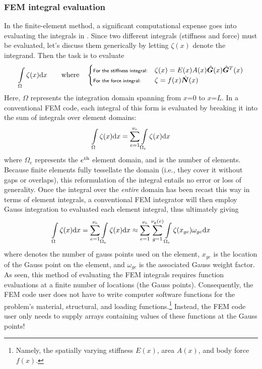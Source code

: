 \subsubsection{FEM integral evaluation}
In the finite-element method, a significant computational expense goes into evaluating the integrals in .  Since two different integrals (stiffness and force) must be evaluated, let's discuss them generically by letting $\zeta(x)$ denote the integrand. Then the task is to evaluate 
\begin{equation}
  \int\limits_\Omega \zeta(x) \mathrm{d} x
\qquad\text{where}\quad
\begin{cases}
\text{\scriptsize{\textsf{For the stiffness integral:}}}& \zeta(x)=E(x)A(x)\hat{\bm{G}}(x)\hat{\bm{G}}^T(x)\\
\text{\scriptsize{\textsf{For the force integral:}}}& \zeta=f(x)\hat{\bm{N}}(x)\\
\end{cases}
\label{eq:LinearBarGenericIntegral}
\end{equation}
Here, $\Omega$ represents the integration domain spanning from $x$=$0$ to $x$=$L$. In a conventional FEM code, each integral of this form is evaluated by breaking it into the sum of integrals over element domains:
\begin{equation}
  \int\limits_\Omega \zeta(x) \mathrm{d} x = \sum\limits_{e=1}^{{\nu_\text{e}}}\int\limits_{\Omega_e} \zeta(x) \mathrm{d} x
\label{eq:LinearBarGenericIntegralBrokenIntoElements}
\end{equation}
where $\Omega_e$ represents the $e^\text{th}$ element domain, and \numelements is the number of elements. Because finite elements fully tessellate the domain (i.e., they cover it without gaps or overlaps), this reformulation of the integral entails no error or loss of generality.  Once the integral over the \emph{entire} domain has been recast this way in terms of element integrals, a conventional FEM integrator will then employ Gauss integration to evaluated each element integral, thus ultimately giving
\begin{equation}
  \int\limits_\Omega \zeta(x) \mathrm{d} x = \sum\limits_{e=1}^{{\nu_\text{e}}}\int\limits_{\Omega_e} \zeta(x) \mathrm{d} x \approx \sum\limits_{e=1}^{{\nu_\text{e}}}\sum\limits_{g=1}^{{\nu_\text{g}(e)}}\int\limits_{\Omega_e} \zeta(x_{ge}) \omega_{ge} \mathrm{d} x
\label{eq:oneDFEMstyleIntegration}
\end{equation}
where \numgaussOnElemente denotes the number of gauss points used on the \eeth element, $x_{ge}$ is the location of the \gth Gauss point on the \eeth element, and $\omega_{ge}$ is the associated Gauss weight factor.  As seen, this method of evaluating the FEM integrals requires function evaluations at a finite number of locations (the Gauss points). Consequently, the FEM code user does not have to write computer software functions for the problem's material, structural, and loading functions.\footnote{Namely, the spatially varying stiffness $E(x)$, area $A(x)$, and body force $f(x)$.} Instead, the FEM code user only needs to supply arrays containing values of these functions at the Gauss points!  

